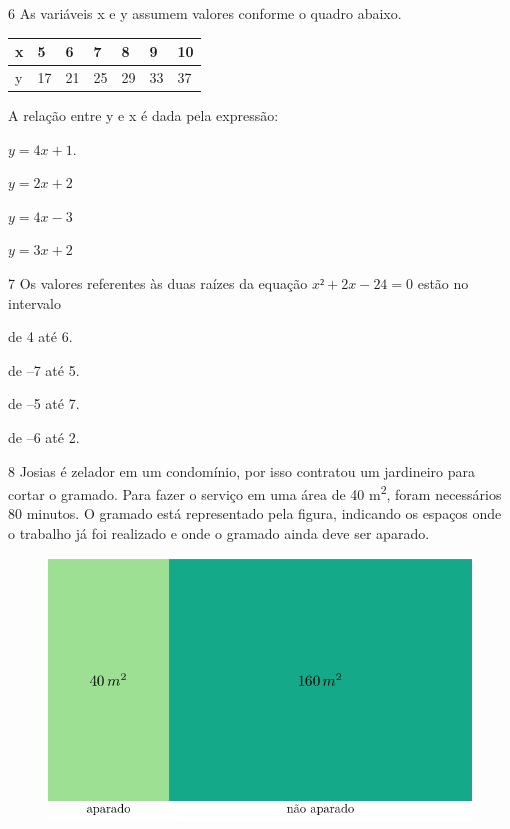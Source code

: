 \pagebreak
\num{6} As variáveis x e y assumem valores conforme o quadro abaixo.

\begin{longtable}[]{@{}lllllll@{}}
\toprule
x & 5 & 6 & 7 & 8 & 9 & 10\tabularnewline
\midrule
\endhead
y & 17 & 21 & 25 & 29 & 33 & 37\tabularnewline
\bottomrule
\end{longtable}

A relação entre y e x é dada pela expressão:

\begin{escolha}
  
  \item $y = 4x + 1$. 
  
  \item $y = 2x + 2$ 
  
  \item $y = 4x - 3$ 
  
  \item $y = 3x + 2$

\end{escolha}

\num{7} Os valores referentes às duas raízes da equação $x² + 2x - 24
= 0$ estão no intervalo

\begin{escolha}

  \item de 4 até 6. 

  \item de --7 até 5. 

  \item de --5 até 7. 

  \item de --6 até 2.

\end{escolha}

\num{8} Josias é zelador em um condomínio, por isso contratou um jardineiro
para cortar o gramado. Para fazer o serviço em uma área de 
40 m\textsuperscript{2}, foram necessários 80 minutos. O gramado está
representado pela figura, indicando os espaços onde o trabalho já foi
realizado e onde o gramado ainda deve ser aparado.

\begin{figure}[htpb!]
\centering
\includegraphics[width=.9\textwidth]{./tikz/043.pdf}
\end{figure}

